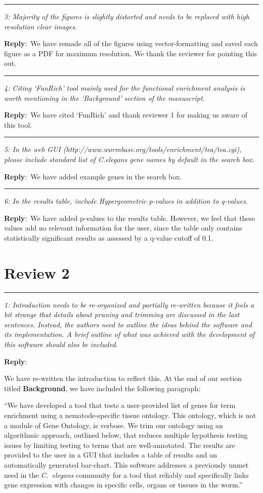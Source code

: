 \documentclass[12pt]{article}
\newcommand{\pointRaised}[2]{\medskip \hrule \noindent 
                \textsl{{\fontseries{b} #1}: #2}}
\newcommand{\reply}{\noindent \textbf{Reply}:\ }
\begin{document}
\pointRaised{3}{Majority of the figures is slightly distorted and needs to be replaced with high resolution clear images.}

\reply{We have remade all of the figures using vector-formatting and saved each figure as a PDF for maximum resolution. We thank the reviewer for pointing this out.}

\pointRaised{4}{Citing ‘FunRich’ tool mainly used for the functional enrichment analysis is worth mentioning in the ‘Background’ section of the manuscript.
}

\reply{We have cited `FunRich' and thank reviewer 1 for making us aware of this tool.}

\pointRaised{5}{In the web GUI (http://www.wormbase.org/tools/enrichment/tea/tea.cgi), please include standard list of C.elegans gene names by default in the search box.}

\reply{We have added example genes in the search box.
}

\pointRaised{6}{In the results table, include Hypergeometric p-values in addition to q-values.}

\reply{We have added p-values to the results table. However, we feel that these values add no relevant information for the user, since the table only contains statistically significant results as assessed by a q-value cutoff of 0.1.}


\section{Review 2}

\pointRaised{1}{Introduction needs to be re-organized and partially re-written because it feels a bit strange that details about pruning and trimming are discussed in the last sentences. Instead, the authors need to outline the ideas behind the software and its implementation. A brief outline of what was achieved with the development of this software should also be included.}

\reply{We have re-written the introduction to reflect this. At the end of our section titled \textbf{Background}, we have included the following paragraph:

``We have developed a tool that tests a user-provided list of genes for term enrichment using a nematode-specific tissue ontology. This ontology, which is not a module of Gene Ontology, is verbose. We trim our ontology using an algorithmic approach, outlined below, that reduces multiple hypothesis testing issues by limiting testing to terms that are well-annotated. The results are provided to the user in a GUI that includes a table of results and an automatically generated bar-chart. This software addresses a previously unmet need in the \emph{C.~elegans} community for a tool that reliably and specifically links gene expression with changes in specific cells, organs or tissues in the worm.''
}
\end{document}
